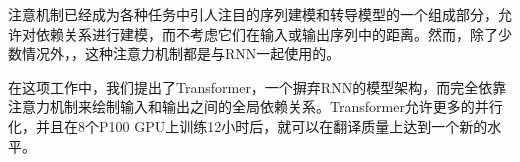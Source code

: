 
注意机制已经成为各种任务中引人注目的序列建模和转导模型的一个组成部分，允许对依赖关系进行建模，而不考虑它们在输入或输出序列中的距离\citep{bahdanau2014neural, structuredAttentionNetworks}。然而，除了少数情况外，\citep{decomposableAttnModel}，这种注意力机制都是与RNN一起使用的。



在这项工作中，我们提出了Transformer，一个摒弃RNN的模型架构，而完全依靠注意力机制来绘制输入和输出之间的全局依赖关系。Transformer允许更多的并行化，并且在8个P100 GPU上训练12小时后，就可以在翻译质量上达到一个新的水平。


